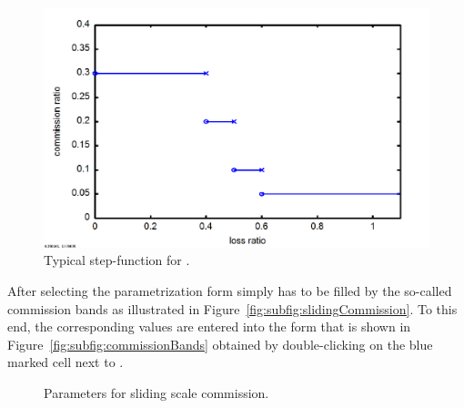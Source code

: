 \begin{figure}[htb]
	\centering
		\includegraphics[scale=0.3]{images/stepfunction.png}
	\caption{Typical step-function for .}%
	\label{fig:stepfunction}
\end{figure}

After selecting  the parametrization form simply has to be
filled by the so-called commission bands as illustrated in Figure~\ref{fig:subfig:slidingCommission}. 
To this end, the corresponding values are entered into the form that
is shown in Figure~\ref{fig:subfig:commissionBands} obtained by double-clicking on the blue marked cell
next to . 

\begin{figure}[htb]
\centering
{}
\hspace{0.5cm}
\caption{Parameters for sliding scale commission.}
\label{fig:slidingCommission}
\end{figure}

